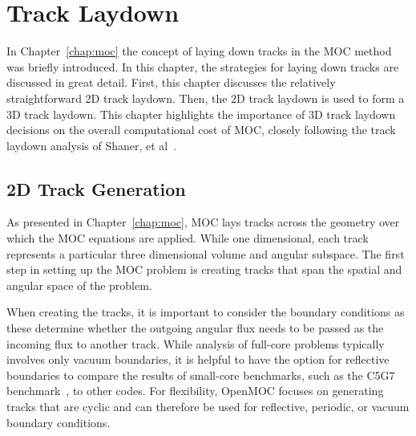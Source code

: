 \chapter{Track Laydown}
\label{chap:track-laydown}

In Chapter~\ref{chap:moc} the concept of laying down tracks in the \ac{MOC} method was briefly introduced. In this chapter, the strategies for laying down tracks are discussed in great detail. First, this chapter discusses the relatively straightforward 2D track laydown. Then, the 2D track laydown is used to form a 3D track laydown. This chapter highlights the importance of 3D track laydown decisions on the overall computational cost of \ac{MOC}, closely following the track laydown analysis of Shaner, et al~\cite{shaner-laydown}.


\section{2D Track Generation}
\label{sec:laydown-2D}

As presented in Chapter~\ref{chap:moc}, \ac{MOC} lays tracks across the geometry over which the \ac{MOC} equations are applied. While one dimensional, each track represents a particular three dimensional volume and angular subspace. The first step in setting up the \ac{MOC} problem is creating tracks that span the spatial and angular space of the problem.

When creating the tracks, it is important to consider the boundary conditions as these determine whether the outgoing angular flux needs to be passed as the incoming flux to another track. While analysis of full-core problems typically involves only vacuum boundaries, it is helpful to have the option for reflective boundaries to compare the results of small-core benchmarks, such as the C5G7 benchmark~\cite{c5g7}, to other codes. For flexibility, OpenMOC focuses on generating tracks that are cyclic and can therefore be used for reflective, periodic, or vacuum boundary conditions.

